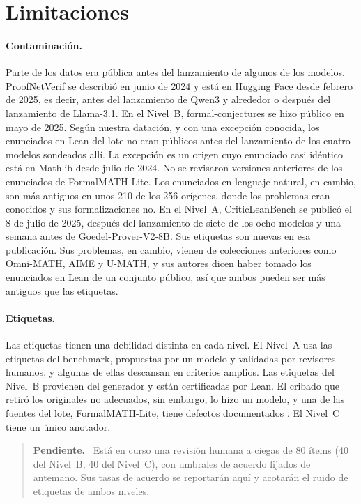 \documentclass[10pt]{article}
\newenvironment{pendiente}{\begin{quote}\small\noindent\textbf{Pendiente.}\ }{\end{quote}}
\begin{document}
\section{Limitaciones}

\paragraph{Contaminación.}
Parte de los datos era pública antes del lanzamiento de algunos de los modelos. ProofNetVerif se describió en junio
de 2024 y está en Hugging Face desde febrero de 2025, es decir, antes del lanzamiento de Qwen3 y alrededor o
después del lanzamiento de Llama-3.1. En el Nivel~B, formal-conjectures se hizo público en mayo de 2025. Según
nuestra datación, y con una excepción conocida, los enunciados en Lean del lote no eran públicos antes del
lanzamiento de los cuatro modelos sondeados allí. La excepción es un origen cuyo enunciado casi idéntico está en
Mathlib desde julio de 2024. No se revisaron versiones anteriores de los enunciados de FormalMATH-Lite. Los
enunciados en lenguaje natural, en cambio, son más antiguos en unos 210 de los 256 orígenes, donde los problemas
eran conocidos y sus formalizaciones no.
En el Nivel~A, CriticLeanBench se publicó el 8 de julio de 2025, después del lanzamiento de siete de los ocho
modelos y una semana antes de Goedel-Prover-V2-8B. Sus etiquetas son nuevas en esa publicación. Sus problemas, en
cambio, vienen de colecciones anteriores como Omni-MATH, AIME y U-MATH, y sus autores dicen haber tomado los
enunciados en Lean de un conjunto público, así que ambos pueden ser más antiguos que las etiquetas.

\paragraph{Etiquetas.}
Las etiquetas tienen una debilidad distinta en cada nivel. El Nivel~A usa las etiquetas del benchmark, propuestas
por un modelo y validadas por revisores humanos, y algunas de ellas descansan en criterios amplios. Las etiquetas
del Nivel~B provienen del generador y están certificadas por Lean. El cribado que retiró los originales no
adecuados, sin embargo, lo hizo un modelo, y una de las fuentes del lote, FormalMATH-Lite, tiene defectos
documentados \citep{ammanamanchi2026faults}.
El Nivel~C tiene un único anotador.

\begin{pendiente}
Está en curso una revisión humana a ciegas de 80 ítems (40 del Nivel~B, 40 del Nivel~C), con umbrales de acuerdo fijados de antemano.
Sus tasas de acuerdo se reportarán aquí y acotarán el ruido de etiquetas de ambos niveles.
\end{pendiente}
\end{document}
